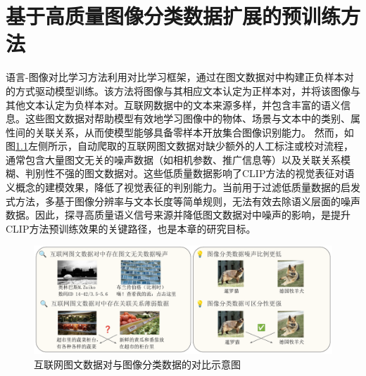 \chapter{基于高质量图像分类数据扩展的预训练方法}
\label{cha:iclip}
语言-图像对比学习方法利用对比学习框架，通过在图文数据对中构建正负样本对的方式驱动模型训练。该方法将图像与其相应文本认定为正样本对，并将该图像与其他文本认定为负样本对。互联网数据中的文本来源多样，并包含丰富的语义信息。这些图文数据对帮助模型有效地学习图像中的物体、场景与文本中的类别、属性间的关联关系，从而使模型能够具备零样本开放集合图像识别能力。
然而，如图\ref{fig:iclip-overall}左侧所示，自动爬取的互联网图文数据对缺少额外的人工标注或校对流程，通常包含大量图文无关的噪声数据（如相机参数、推广信息等）以及关联关系模糊、判别性不强的图文数据对。这些低质量数据影响了CLIP方法的视觉表征对语义概念的建模效果，降低了视觉表征的判别能力。当前用于过滤低质量数据的启发式方法\cite{sharma-etal-2018-conceptual,changpinyo2021conceptual}，多基于图像分辨率与文本长度等简单规则，无法有效去除语义层面的噪声数据。因此，探寻高质量语义信号来源并降低图文数据对中噪声的影响，是提升CLIP方法预训练效果的关键路径，也是本章的研究目标。

\begin{figure}
  \centering
  \includegraphics[width=1.0\linewidth]{figures/论文-iCLIP-概要-v2.pdf}
  \caption{互联网图文数据对与图像分类数据的对比示意图}
  \label{fig:iclip-overall}
\end{figure}

